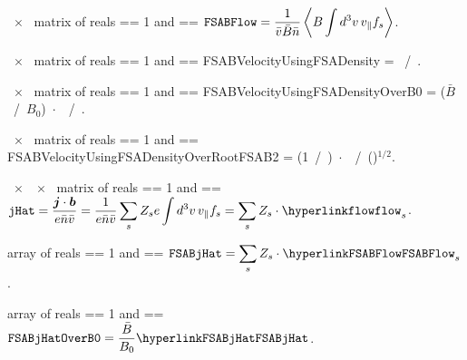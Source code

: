 \myhrule

{~$\times$~ matrix of reals}
{ == 1 and  == \true}
{$\displaystyle \text{\ttfamily FSABFlow} =  \frac{1}{\bar{v} \bar{B} \bar{n}} \left\langle B \int d^3v \, v_{\|} f_s \right\rangle$.}

\myhrule

{~$\times$~ matrix of reals}
{ == 1 and  == \true}
{{\ttfamily FSABVelocityUsingFSADensity} =  ~/~.}

\myhrule

{~$\times$~ matrix of reals}
{ == 1 and  == \true}
{{\ttfamily FSABVelocityUsingFSADensityOverB0} =  ($\bar{B}$~/~$B_0$)~$\cdot$~~/~.}

\myhrule

{~$\times$~ matrix of reals}
{ == 1 and  == \true}
{{\ttfamily FSABVelocityUsingFSADensityOverRootFSAB2} =  (1~/~)~$\cdot$~~/~()${}^{1/2}$.}

\myhrule

{~$\times$~~$\times$~ matrix of reals}
{ == 1 and  == \true}
{$\displaystyle \text{\ttfamily jHat} = \frac{\bm{j} \cdot \bm{b}}{e \bar{n} \bar{v}} = \frac{1}{e \bar{n} \bar{v}} \sum_s Z_s e \int d^3v \, v_{\|} f_s = \sum_s Z_s \cdot \text{\parlink{flow}}_s$.}

\myhrule

{ array of reals}
{ == 1 and  == \true}
{$\displaystyle \text{\ttfamily FSABjHat} =  \sum_s Z_s \cdot \text{\parlink{FSABFlow}}_s$.}

\myhrule

{ array of reals}
{ == 1 and  == \true}
{$\displaystyle \text{\ttfamily FSABjHatOverB0} =  \frac{\bar{B}}{B_0} \text{\parlink{FSABjHat}}$.}

